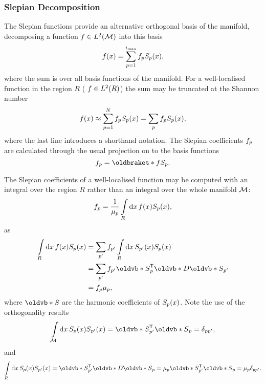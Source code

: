 \subsubsection{Slepian Decomposition}

The Slepian functions provide an alternative orthogonal basis of the manifold, decomposing a function \(f \in L^{2}(\mathcal{M})\) into this basis
%
\begin{equation}
	f(x)
	= \sum\limits_{p=1}^{i_{\text{max}}} {f}_{p} {S}_{p}(x),
\end{equation}
%
where the sum is over all basis functions of the manifold.
For a well-localised function in the region \(R\) (\ie{} \(f \in L^{2}(R)\)) the sum may be truncated at the Shannon number
%
\begin{equation}
	f(x)
	\approx \sum\limits_{p=1}^{N} {f}_{p} {S}_{p}(x)
	= \sum\limits_{p} {f}_{p} {S}_{p}(x),
\end{equation}
%
where the last line introduces a shorthand notation.
The Slepian coefficients \({f}_{p}\) are calculated through the usual projection on to the basis functions
%
\begin{equation}
	\slepian{f}
	= \braket{f}{\slepian{S}}.
\end{equation}

The Slepian coefficients of a well-localised function may be computed with an integral over the region \(R\) rather than an integral over the whole manifold \(\mathcal{M}{}\):
%
\begin{equation}
	{f}_{p}
	= \frac{1}{{\mu}_{p}} \int\limits_{R} \dd{x} f(x) {S}_{p}(x),
\end{equation}
%
as
%
\begin{align}
	\integrateRegion{\meshVolume} \mesh{f} \mesh{\slepian{S}}
	 & = \slepianSum['] \slepian[']{f} \integrateRegion{\meshVolume} \mesh{\slepian[']{S}} \mesh{\slepian{S}} \nonumber \\
	 & = \slepianSum['] \slepian[']{f} \transpose{\slepian{\vb{S}}} \vb{D} \slepian[']{\vb{S}} \nonumber                \\
	 & = \slepian{f} \slepian{\mu},
\end{align}
%
where \(\vb{S}\) are the harmonic coefficients of \({S}_{p}(x)\).
Note the use of the orthogonality results
%
\begin{equation}\label{eq:chapter4_orthogonality_manifold}
	\integrateManifold{x} \mesh{\slepian{S}} \mesh{\slepian[']{S}}
	= \transpose{\slepian[']{\vb{S}}} \slepian{\vb{S}}
	= \delta_{pp'},
\end{equation}
%
and
%
\begin{equation}
	\integrateRegion{\meshVolume} \mesh{\slepian{S}} \mesh{\slepian[']{S}}
	= \transpose{\slepian[']{\vb{S}}} \vb{D} \slepian{\vb{S}}
	= \slepian{\mu} \transpose{\slepian[']{\vb{S}}} \slepian{\vb{S}}
	= \slepian{\mu} \delta_{pp'}.
\end{equation}

